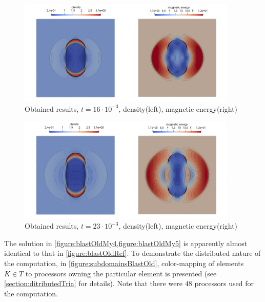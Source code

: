 \begin{figure}[H]
	\begin{center}
		\includegraphics[width=0.93\textwidth]{img/mhd-blast/old/mynew4.jpg}
	\caption{Obtained results, $t = 16\cdot 10^{-3}$, density(left), magnetic energy(right)}
	\label{figure:blastOldMy4}
	\end{center}
\end{figure}
\vspace{-8mm}

\begin{figure}[H]
	\begin{center}
		\includegraphics[width=0.93\textwidth]{img/mhd-blast/old/mynew5.jpg}
	\caption{Obtained results, $t = 23\cdot 10^{-3}$, density(left), magnetic energy(right)}
	\label{figure:blastOldMy5}
	\end{center}
\end{figure}
\vspace{-5mm}
The solution in \cref{figure:blastOldMy4,figure:blastOldMy5}  is apparently almost identical to that in \cref{figure:blastOldRef}. To demonstrate the distributed nature of the computation, in \cref{figure:subdomainsBlastOld}, color-mapping of elements $K \in T$ to processors owning the particular element is presented (see \cref{section:ditributedTria} for details). Note that there were $48$ processors used for the computation.

